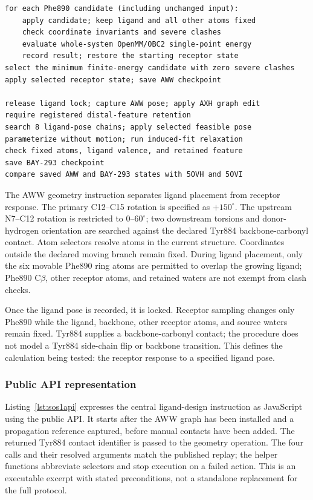 \documentclass[11pt]{article}
\begin{document}
\begin{small}
\begin{lstlisting}[language={},float=htbp,caption={SOS1 design protocol (pseudocode).},label={lst:sos1protocol}]
for each Phe890 candidate (including unchanged input):
    apply candidate; keep ligand and all other atoms fixed
    check coordinate invariants and severe clashes
    evaluate whole-system OpenMM/OBC2 single-point energy
    record result; restore the starting receptor state
select the minimum finite-energy candidate with zero severe clashes
apply selected receptor state; save AWW checkpoint

release ligand lock; capture AWW pose; apply AXH graph edit
require registered distal-feature retention
search 8 ligand-pose chains; apply selected feasible pose
parameterize without motion; run induced-fit relaxation
check fixed atoms, ligand valence, and retained feature
save BAY-293 checkpoint
compare saved AWW and BAY-293 states with 5OVH and 5OVI
\end{lstlisting}

The AWW geometry instruction separates ligand placement from receptor response. The primary C12--C15 rotation is specified as $+150^{\circ}$. The upstream N7--C12 rotation is restricted to $0$--$60^{\circ}$; two downstream torsions and donor-hydrogen orientation are searched against the declared Tyr884 backbone-carbonyl contact. Atom selectors resolve atoms in the current structure. Coordinates outside the declared moving branch remain fixed. During ligand placement, only the six movable Phe890 ring atoms are permitted to overlap the growing ligand; Phe890 C$\beta$, other receptor atoms, and retained waters are not exempt from clash checks.

Once the ligand pose is recorded, it is locked. Receptor sampling changes only Phe890 while the ligand, backbone, other receptor atoms, and source waters remain fixed. Tyr884 supplies a backbone-carbonyl contact; the procedure does not model a Tyr884 side-chain flip or backbone transition. This defines the calculation being tested: the receptor response to a specified ligand pose.

\subsubsection{Public API representation}

Listing~\ref{lst:sos1api} expresses the central ligand-design instruction as JavaScript using the public API. It starts after the AWW graph has been installed and a propagation reference captured, before manual contacts have been added. The returned Tyr884 contact identifier is passed to the geometry operation. The four calls and their resolved arguments match the published replay; the helper functions abbreviate selectors and stop execution on a failed action. This is an executable excerpt with stated preconditions, not a standalone replacement for the full protocol.


\end{small}
\end{document}

